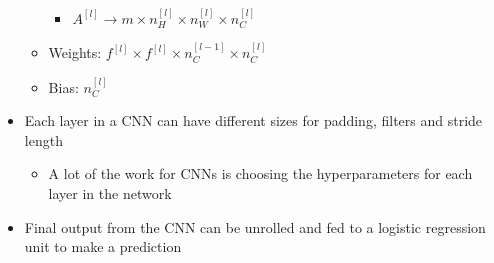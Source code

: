 \documentclass[12pt, letterpaper]{article}
\begin{document}
\begin{itemize}
\begin{itemize}
            \begin{itemize}
                \item[] $A^{[l]} \rightarrow m \times n_H^{[l]} \times n_W^{[l]} \times n_C^{[l]}$
            \end{itemize}
            \item Weights: $f^{[l]} \times f^{[l]} \times n_C^{[l-1]} \times n_C^{[l]}$
            \item Bias: $n_C^{[l]}$
        \end{itemize}
        \item Each layer in a CNN can have different sizes for padding, filters and stride length
        \begin{itemize}
            \item A lot of the work for CNNs is choosing the hyperparameters for each layer in the network
        \end{itemize}
        \item Final output from the CNN can be unrolled and fed to a logistic regression unit to make a prediction
        

\end{itemize}
\end{document}
